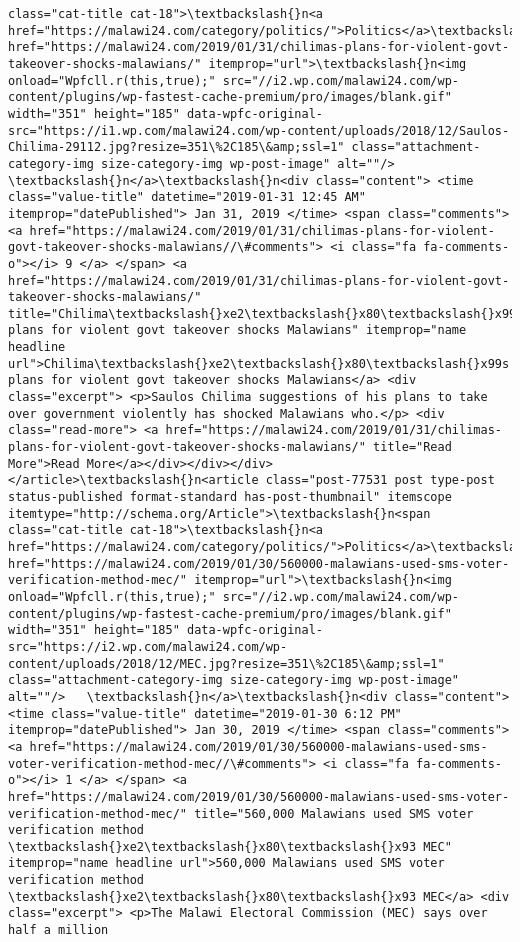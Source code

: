 \documentclass[11pt]{article}
\begin{document}
\begin{Verbatim}[commandchars=\\\{\}]
class="cat-title cat-18">\textbackslash{}n<a href="https://malawi24.com/category/politics/">Politics</a>\textbackslash{}n</span>\textbackslash{}n<a href="https://malawi24.com/2019/01/31/chilimas-plans-for-violent-govt-takeover-shocks-malawians/" itemprop="url">\textbackslash{}n<img onload="Wpfcll.r(this,true);" src="//i2.wp.com/malawi24.com/wp-content/plugins/wp-fastest-cache-premium/pro/images/blank.gif" width="351" height="185" data-wpfc-original-src="https://i1.wp.com/malawi24.com/wp-content/uploads/2018/12/Saulos-Chilima-29112.jpg?resize=351\%2C185\&amp;ssl=1" class="attachment-category-img size-category-img wp-post-image" alt=""/>   \textbackslash{}n</a>\textbackslash{}n<div class="content"> <time class="value-title" datetime="2019-01-31 12:45 AM" itemprop="datePublished"> Jan 31, 2019 </time> <span class="comments"> <a href="https://malawi24.com/2019/01/31/chilimas-plans-for-violent-govt-takeover-shocks-malawians//\#comments"> <i class="fa fa-comments-o"></i> 9 </a> </span> <a href="https://malawi24.com/2019/01/31/chilimas-plans-for-violent-govt-takeover-shocks-malawians/" title="Chilima\textbackslash{}xe2\textbackslash{}x80\textbackslash{}x99s plans for violent govt takeover shocks Malawians" itemprop="name headline url">Chilima\textbackslash{}xe2\textbackslash{}x80\textbackslash{}x99s plans for violent govt takeover shocks Malawians</a> <div class="excerpt"> <p>Saulos Chilima suggestions of his plans to take over government violently has shocked Malawians who.</p> <div class="read-more"> <a href="https://malawi24.com/2019/01/31/chilimas-plans-for-violent-govt-takeover-shocks-malawians/" title="Read More">Read More</a></div></div></div></article>\textbackslash{}n<article class="post-77531 post type-post status-published format-standard has-post-thumbnail" itemscope itemtype="http://schema.org/Article">\textbackslash{}n<span class="cat-title cat-18">\textbackslash{}n<a href="https://malawi24.com/category/politics/">Politics</a>\textbackslash{}n</span>\textbackslash{}n<a href="https://malawi24.com/2019/01/30/560000-malawians-used-sms-voter-verification-method-mec/" itemprop="url">\textbackslash{}n<img onload="Wpfcll.r(this,true);" src="//i2.wp.com/malawi24.com/wp-content/plugins/wp-fastest-cache-premium/pro/images/blank.gif" width="351" height="185" data-wpfc-original-src="https://i2.wp.com/malawi24.com/wp-content/uploads/2018/12/MEC.jpg?resize=351\%2C185\&amp;ssl=1" class="attachment-category-img size-category-img wp-post-image" alt=""/>   \textbackslash{}n</a>\textbackslash{}n<div class="content"> <time class="value-title" datetime="2019-01-30 6:12 PM" itemprop="datePublished"> Jan 30, 2019 </time> <span class="comments"> <a href="https://malawi24.com/2019/01/30/560000-malawians-used-sms-voter-verification-method-mec//\#comments"> <i class="fa fa-comments-o"></i> 1 </a> </span> <a href="https://malawi24.com/2019/01/30/560000-malawians-used-sms-voter-verification-method-mec/" title="560,000 Malawians used SMS voter verification method \textbackslash{}xe2\textbackslash{}x80\textbackslash{}x93 MEC" itemprop="name headline url">560,000 Malawians used SMS voter verification method \textbackslash{}xe2\textbackslash{}x80\textbackslash{}x93 MEC</a> <div class="excerpt"> <p>The Malawi Electoral Commission (MEC) says over half a million 
\end{Verbatim}
\end{document}
